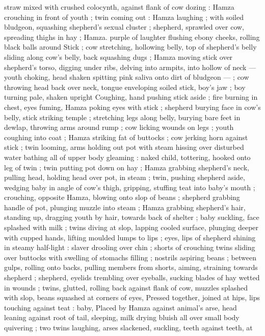 straw mixed with crushed colocynth, against flank of cow dozing :
Hamza crouching in front of youth ; twin coming out : Hamza
laughing ; with soiled bludgeon, squashing shepherd's sexual cluster
; shepherd, sprawled over cow, spreading thighs in hay ; Hamza.
purple of laughter flushing ebony cheeks, rolling black balls around
Stick ; cow stretching, hollowing belly, top of shepherd's belly sliding
along cow's belly, back squashing dugs ; Hamza moving stick over
shepherd's torso, digging under ribs, delving into armpits, into
hollow of neck --- youth choking, head shaken spitting pink saliva
onto dirt of bludgeon --- ; cow throwing head back over neck, tongue
enveloping soiled stick, boy's jaw ; boy turning pale, shaken upright
Coughing, hand pushing stick aside ; fire burning in chest, eyes
fuming, Hamza poking eyes with stick ; shepherd burying face in
cow's belly, stick striking temple ; stretching legs along belly, burying
bare feet in dewlap, throwing arms around rump ; cow licking wounds
on legs ; youth coughing into coat ; Hamza striking fat of buttocks ;
cow jerking horn against stick ; twin looming, arms holding out pot
with steam hissing over disturbed water bathing all of upper body
gleaming : naked child, tottering, hooked onto leg of twin ; twin
putting pot down on hay ; Hamza grabbing shepherd's neck, pulling
head, holding head over pot, in steam ; twin, pushing shepherd
aside, wedging baby in angle of cow's thigh, gripping, stuffing teat
into baby’s mouth ; crouching, opposite Hamza, blowing onto slop of
beans ; shepherd grabbing handle of pot, plunging muzzle into
steam ; Hamza grabbing shepherd's hair, standing up, dragging
youth by hair, towards back of shelter ; baby suckling, face splashed
with milk ; twins diving at slop, lapping cooled surface, plunging
deeper with cupped hands, lifting moulded lumps to lips ; eyes, lips
of shepherd shining in steamy half-light : slaver drooling over chin ;
shorts of crouching twins sliding over buttocks with swelling of
stomachs filling ; nostrils aspiring beans ; between gulps, rolling onto
backs, pulling members from shorts, aiming, straining towards
shepherd ; shepherd, eyelids trembling over eyeballs, sucking blades
of hay wetted in wounds ; twins, glutted, rolling back against flank of
cow, muzzles splashed with slop, beans squashed at corners of eyes,
Pressed together, joined at hips, lips touching against teat : baby,
Placed by Hamza against animal's arse, head leaning against root of
tail, sleeping, milk drying bluish all over small body quivering ; two
twins laughing, arses slackened, suckling, teeth against teeth, at

